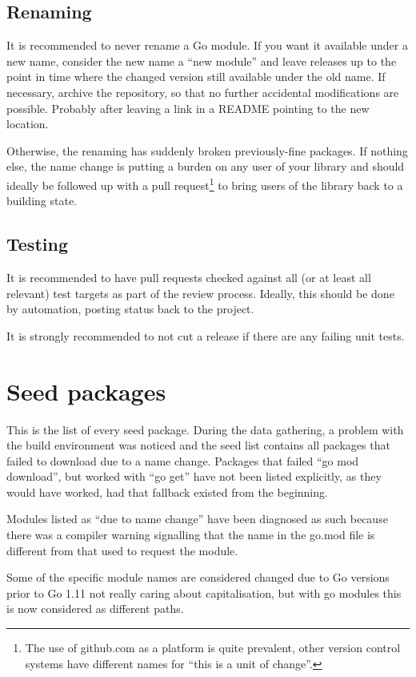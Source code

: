 \documentclass[a4paper]{paper}
\begin{document}
\subsection{Renaming}
It is recommended to never rename a Go module. If you want it available
under a new name, consider the new name a ``new module'' and leave
releases up to the point in time where the changed version still
available under the old name. If necessary, archive the repository, so
that no further accidental modifications are possible. Probably after
leaving a link in a README pointing to the new location.

Otherwise, the renaming has suddenly broken previously-fine
packages. If nothing else, the name change is putting a burden on any
user of your library and should ideally be followed up with a pull
request\footnote{The use of github.com as a platform is quite
  prevalent, other version control systems have different names for
  ``this is a unit of change''.} to bring users of the library back to
a building state.

\subsection{Testing}

It is recommended to have pull requests checked against all (or at
least all relevant) test targets as part of the review
process. Ideally, this should be done by automation, posting status
back to the project.

It is strongly recommended to not cut a release if there are any
failing unit tests.

\section{Seed packages}

This is the list of every seed package. During the data gathering, a
problem with the build environment was noticed and the seed list
contains all packages that failed to download due to a name
change. Packages that failed ``go mod download'', but worked with ``go
get'' have not been listed explicitly, as they would have worked, had
that fallback existed from the beginning.

Modules listed as ``due to name change'' have been diagnosed as such
because there was a compiler warning signalling that the name in the
go.mod file is different from that used to request the module.

Some of the specific module names are considered changed due to Go
versions prior to Go 1.11 not really caring about capitalisation, but
with go modules this is now considered as different paths.


\end{document}
